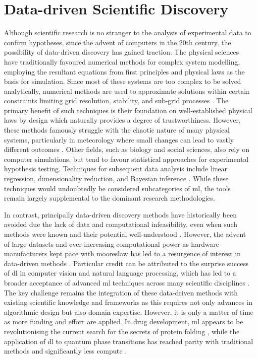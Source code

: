 \section{Data-driven Scientific Discovery}

Although scientific research is no stranger to the analysis of experimental data to confirm hypotheses, since the advent of computers in the 20th century, the possibility of data-driven discovery has gained traction. The physical sciences have traditionally favoured numerical methods for complex system modelling, employing the resultant equations from first principles and physical laws as the basis for simulation. Since most of these systems are too complex to be solved analytically, numerical methods are used to approximate solutions within certain constraints limiting grid resolution, stability, and sub-grid processes \citep{Lynch2008}. The primary benefit of such techniques is their foundation on well-established physical laws by design which naturally provides a degree of trustworthiness. However, these methods famously struggle with the chaotic nature of many physical systems, particularly in meteorology where small changes can lead to vastly different outcomes \citep{Lorenz1963}. Other fields, such as biology and social sciences, also rely on computer simulations, but tend to favour statistical approaches for experimental hypothesis testing. Techniques for subsequent data analysis include linear regression, dimensionality reduction, and Bayesian inference \citep{Ackermann2011,Weinstein2010}. While these techniques would undoubtedly be considered subcategories of \acrshort{ml}, the tools remain largely supplemental to the dominant research methodologies.

In contrast, principally data-driven discovery methods have historically been avoided due the lack of data and computational infeasibility, even when such methods were known and their potential well-understood \citep{Rosenblatt1957,Rumelhart1986}. However, the advent of large datasets and ever-increasing computational power as hardware manufacturers kept pace with \Gls{mooreslaw} has led to a resurgence of interest in data-driven methods \citep{Haber2025}. Particular credit can be attributed to the surprise success of \acrfull{dl} in computer vision and natural language processing, which has led to a broader acceptance of advanced \acrfull{ml} techniques across many scientific disciplines \citep{Haber2025,Krizhevsky2017}. The key challenge remains the integration of these data-driven methods with existing scientific knowledge and frameworks as this requires not only advances in algorithmic design but also domain expertise. However, it is only a matter of time as more funding and effort are applied. In drug development, \acrfull{ml} appears to be revolutionising the current search for the secrets of protein folding \citep{Jumper2021}, while the application of \acrshort{dl} to quantum phase transitions has reached parity with traditional methods and significantly less compute \citep{Huembeli2018}.

